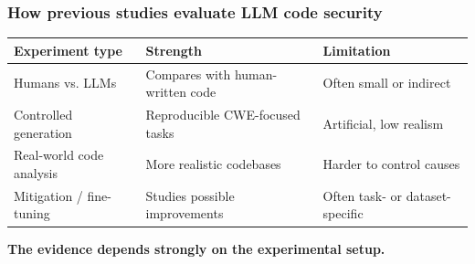 \begin{frame}
\frametitle{How previous studies evaluate LLM code security}

\begin{center}
\begin{tabular}{p{}p{}p{}}
\hline
\textbf{Experiment type} & \textbf{Strength} & \textbf{Limitation} \\
\hline
Humans vs. LLMs & Compares with human-written code & Often small or indirect \\
Controlled generation & Reproducible CWE-focused tasks & Artificial, low realism \\
Real-world code analysis & More realistic codebases & Harder to control causes \\
Mitigation / fine-tuning & Studies possible improvements & Often task- or dataset-specific \\
\hline
\end{tabular}
\end{center}

\bigskip

\centering
\textbf{The evidence depends strongly on the experimental setup.}

\end{frame}


